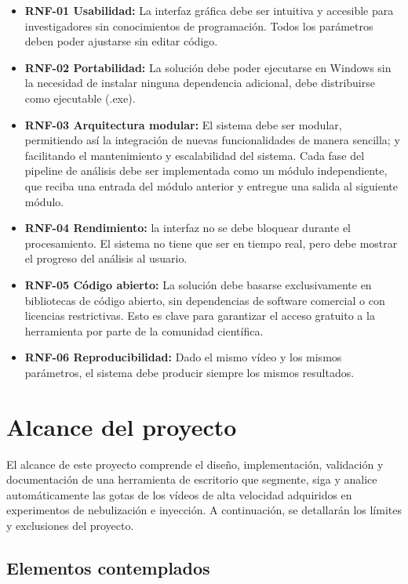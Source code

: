 \begin{itemize}
    \item \textbf{RNF-01 Usabilidad:} La interfaz gráfica debe ser intuitiva y accesible para investigadores sin conocimientos de programación. Todos los parámetros deben poder ajustarse sin editar código.
    \item \textbf{RNF-02 Portabilidad:} La solución debe poder ejecutarse en  Windows sin la necesidad de instalar ninguna dependencia adicional, debe distribuirse como ejecutable (.exe).
    \item \textbf{RNF-03 Arquitectura modular:} El sistema debe ser modular, permitiendo así la integración de nuevas funcionalidades de manera sencilla; y facilitando el mantenimiento y escalabilidad del sistema. Cada fase del pipeline de análisis debe ser implementada como un módulo independiente, que reciba una entrada del módulo anterior y entregue una salida al siguiente módulo.
    \item \textbf{RNF-04 Rendimiento:} la interfaz no se debe bloquear durante el procesamiento. El sistema no tiene que ser en tiempo real, pero debe mostrar el progreso del análisis al usuario.
    \item \textbf{RNF-05 Código abierto:} La solución debe basarse exclusivamente en bibliotecas de código abierto, sin dependencias de software comercial o con licencias restrictivas. Esto es clave para garantizar el acceso gratuito a la herramienta por parte de la comunidad científica.
    \item \textbf{RNF-06 Reproducibilidad:} Dado el mismo vídeo y los mismos parámetros, el sistema debe producir siempre los mismos resultados.
\end{itemize}


\section{Alcance del proyecto}

El alcance de este proyecto comprende el diseño, implementación, validación y documentación de una herramienta de escritorio que segmente, siga y analice automáticamente las gotas de los vídeos de alta velocidad adquiridos en experimentos de nebulización e inyección. A continuación, se detallarán los límites y exclusiones del proyecto.

\subsection{Elementos contemplados}

